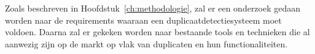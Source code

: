 
\chapter{}%
\label{ch:Onderzoek}

Zoals beschreven in Hoofdstuk~\ref{ch:methodologie}, zal er een onderzoek gedaan worden naar de requirements waaraan een duplicaatdetectiesysteem moet voldoen. Daarna zal er gekeken worden naar bestaande tools en technieken die al aanwezig zijn op de markt op vlak van duplicaten en hun functionaliteiten. 

\section{}%
\label{sec:requirementsanalyse}

